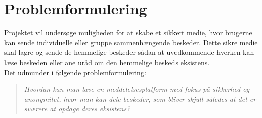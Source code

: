 \section{Problemformulering}
Projektet vil undersøge muligheden for at skabe et sikkert medie, hvor brugerne kan sende individuelle eller gruppe sammenhængende beskeder. Dette sikre medie skal lagre og sende de hemmelige beskeder sådan at uvedkommende hverken kan læse beskeden eller ane uråd om den hemmelige beskeds eksistens. 
\\Det udmunder i følgende problemformulering:
\begin{quote}
\textit{Hvordan kan man lave en meddelelsesplatform med fokus på sikkerhed og anonymitet, hvor man kan dele beskeder, som bliver skjult således at det er sværere at opdage deres eksistens?}
\end{quote}
